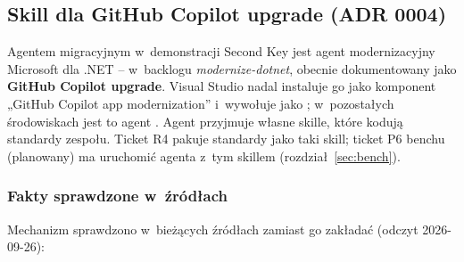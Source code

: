 
\subsection{Skill dla GitHub Copilot upgrade (ADR 0004)}\label{sec:standardy-skill}

Agentem migracyjnym w~demonstracji Second Key jest agent modernizacyjny Microsoft dla .NET --
w~backlogu \emph{modernize-dotnet}, obecnie dokumentowany jako \textbf{GitHub Copilot
upgrade}. Visual Studio nadal instaluje go jako komponent „GitHub Copilot app modernization”
i~wywołuje jako ; w~pozostałych środowiskach jest to agent
. Agent przyjmuje własne skille, które kodują standardy zespołu. Ticket R4
pakuje standardy jako taki skill; ticket P6 benchu (planowany) ma uruchomić agenta z~tym
skillem (rozdział~\ref{sec:bench}).

\subsubsection{Fakty sprawdzone w~źródłach}

Mechanizm sprawdzono w~bieżących źródłach zamiast go zakładać (odczyt 2026-09-26):

